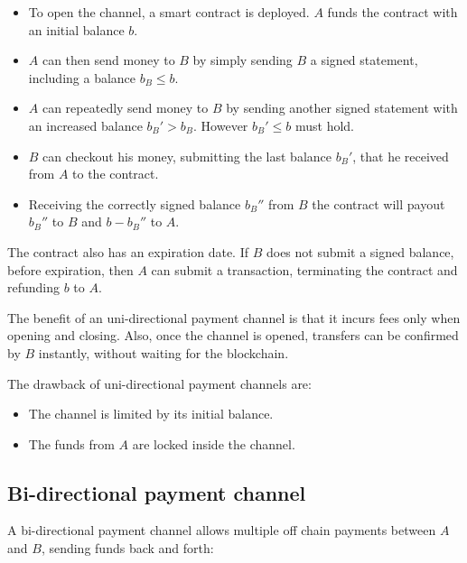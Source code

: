 \begin{itemize}
	\item To open the channel, a smart contract is deployed. $A$ funds the contract with an initial balance $b$.
	\item $A$ can then send money to $B$ by simply sending $B$ a signed statement, including a balance $b_B\leq b$.
	\item $A$ can repeatedly send money to $B$ by sending another signed statement with an increased balance $b_B'> b_B$. However $b_B'\leq b$ must hold.
	\item $B$ can checkout his money, submitting the last balance $b_B'$, that he received from $A$ to the contract.
	\item Receiving the correctly signed balance $b_B''$ from $B$ the contract will payout $b_B''$ to $B$ and $b-b_B''$ to $A$.
\end{itemize}

The contract also has an expiration date. If $B$ does not submit a signed balance, before expiration, then $A$ can submit a transaction, terminating the contract and refunding $b$ to $A$.

\begin{note}
The benefit of an uni-directional payment channel is that it incurs fees only when opening and closing. Also, once the channel is opened, transfers can be confirmed by $B$ instantly, without waiting for the blockchain.

The drawback of uni-directional payment channels are:
\begin{itemize}
	\item The channel is limited by its initial balance. 
	\item The funds from $A$ are locked inside the channel. 
\end{itemize}	
\end{note}


\subsection{Bi-directional payment channel}
A bi-directional payment channel allows multiple off chain payments between $A$ and $B$, sending funds back and forth:

